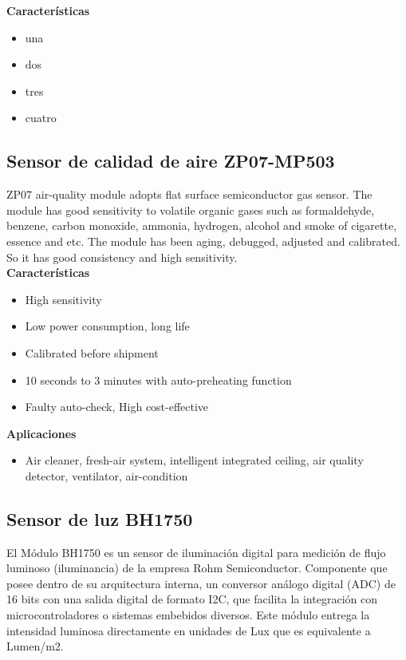 \textbf{Características}
\begin{itemize}
    \item una
    \item dos
    \item tres
    \item cuatro
\end{itemize}

\subsection{Sensor de calidad de aire ZP07-MP503}

ZP07 air-quality module adopts flat surface semiconductor gas sensor. The module has good sensitivity to volatile organic gases such as formaldehyde, benzene, carbon
monoxide, ammonia, hydrogen, alcohol and smoke of cigarette, essence and etc. The module has been aging, debugged, adjusted and calibrated. So it has good consistency and high sensitivity.\\

\textbf{Características}
\begin{itemize}
    \item High sensitivity
    \item Low power consumption, long life
    \item Calibrated before shipment
    \item 10 seconds to 3 minutes with auto-preheating function
    \item Faulty auto-check, High cost-effective
\end{itemize}

\textbf{Aplicaciones}
\begin{itemize}
    \item Air cleaner, fresh-air system, intelligent integrated ceiling, air quality detector, ventilator, air-condition
\end{itemize}


\subsection{Sensor de luz BH1750}

El Módulo BH1750 es un sensor de iluminación digital para medición de flujo luminoso (iluminancia) de la empresa Rohm Semiconductor. Componente que posee dentro de su arquitectura interna, un conversor análogo digital (ADC) de 16 bits con una salida digital de formato I2C, que facilita la integración con microcontroladores o sistemas embebidos diversos. Este módulo entrega la intensidad luminosa directamente en unidades de Lux que es equivalente a Lumen/m2.\\

